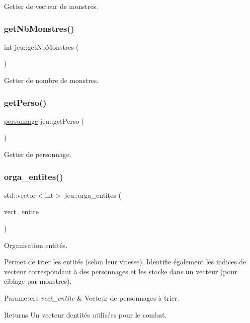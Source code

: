 Getter de vecteur de monstres. 

\mbox{\label{classjeu_ae172cfaf3e5c97e1576dc4069d48ec94}} 
\subsubsection{\texorpdfstring{get\+Nb\+Monstres()}{getNbMonstres()}}
{\footnotesize\ttfamily int jeu\+::get\+Nb\+Monstres (\begin{DoxyParamCaption}{ }\end{DoxyParamCaption})}



Getter de nombre de monstres. 

\mbox{\label{classjeu_a8bd58d1469db0d7595bb732403036823}} 
\subsubsection{\texorpdfstring{get\+Perso()}{getPerso()}}
{\footnotesize\ttfamily \hyperlink{classpersonnage}{personnage} jeu\+::get\+Perso (\begin{DoxyParamCaption}{ }\end{DoxyParamCaption})}



Getter de personnage. 

\mbox{\label{classjeu_afd7a155c8adcee663d6aeb98b2dae010}} 
\subsubsection{\texorpdfstring{orga\+\_\+entites()}{orga\_entites()}}
{\footnotesize\ttfamily std\+::vector$<$int$>$ jeu\+::orga\+\_\+entites (\begin{DoxyParamCaption}\item[{std\+::vector$<$ \hyperlink{classentite}{entite} $>$ \&}]{vect\+\_\+entite }\end{DoxyParamCaption})}



Organisation entités. 

Permet de trier les entités (selon leur vitesse). Identifie également les indices de vecteur correspondant à des personnages et les stocke dans un vecteur (pour ciblage par monstres). 
\begin{DoxyParams}{Parameters}
{\em vect\+\_\+entite} & Vecteur de personnages à trier. \\
\hline
\end{DoxyParams}
\begin{DoxyReturn}{Returns}
Un vecteur d\textquotesingle{}entités utilisées pour le combat. 
\end{DoxyReturn}
\mbox{\label{classjeu_a110399c4103d3d4391f2007856c3e009}} 
